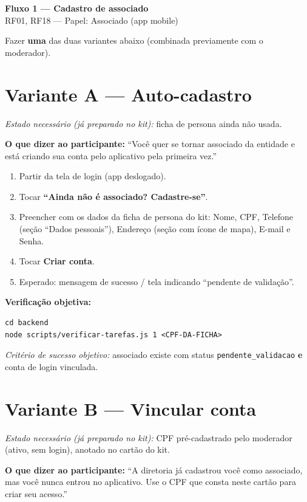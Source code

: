 \documentclass[11pt,a4paper]{article}
\newcommand{\dizer}[1]{%
  \noindent\colorbox{lightbg}{%
    \begin{minipage}{0.95\linewidth}
    \vspace{1mm}
    \textbf{O que dizer ao participante:} ``#1''
    \vspace{1mm}
    \end{minipage}%
  }\vspace{3mm}
}
\newcommand{\criterio}[1]{\noindent\textit{Critério de sucesso objetivo:} #1}
\newcommand{\estado}[1]{\noindent\textit{Estado necessário (já preparado no kit):} #1\vspace{2mm}}
\begin{document}
\begin{center}
  {\LARGE\bfseries\color{brandgreen} Fluxo 1 --- Cadastro de associado}\\[1mm]
  {\large RF01, RF18 --- Papel: Associado (app mobile)}
\end{center}

\vspace{2mm}
\noindent Fazer \textbf{uma} das duas variantes abaixo (combinada previamente com o moderador).

\section*{Variante A --- Auto-cadastro}

\estado{ficha de persona ainda não usada.}

\dizer{Você quer se tornar associado da entidade e está criando sua conta pelo aplicativo pela
primeira vez.}

\begin{enumerate}[leftmargin=6mm]
  \item Partir da tela de login (app deslogado).
  \item Tocar \textbf{``Ainda não é associado? Cadastre-se''}.
  \item Preencher com os dados da ficha de persona do kit: Nome, CPF, Telefone (seção ``Dados
    pessoais''), Endereço (seção com ícone de mapa), E-mail e Senha.
  \item Tocar \textbf{Criar conta}.
  \item Esperado: mensagem de sucesso / tela indicando ``pendente de validação''.
\end{enumerate}

\textbf{Verificação objetiva:}
\begin{verbatim}
cd backend
node scripts/verificar-tarefas.js 1 <CPF-DA-FICHA>
\end{verbatim}
\criterio{associado existe com status \texttt{pendente\_validacao} \textbf{e} conta de login
vinculada.}

\section*{Variante B --- Vincular conta}

\estado{CPF pré-cadastrado pelo moderador (ativo, sem login), anotado no cartão do kit.}

\dizer{A diretoria já cadastrou você como associado, mas você nunca entrou no aplicativo. Use o
CPF que consta neste cartão para criar seu acesso.}
\end{document}
